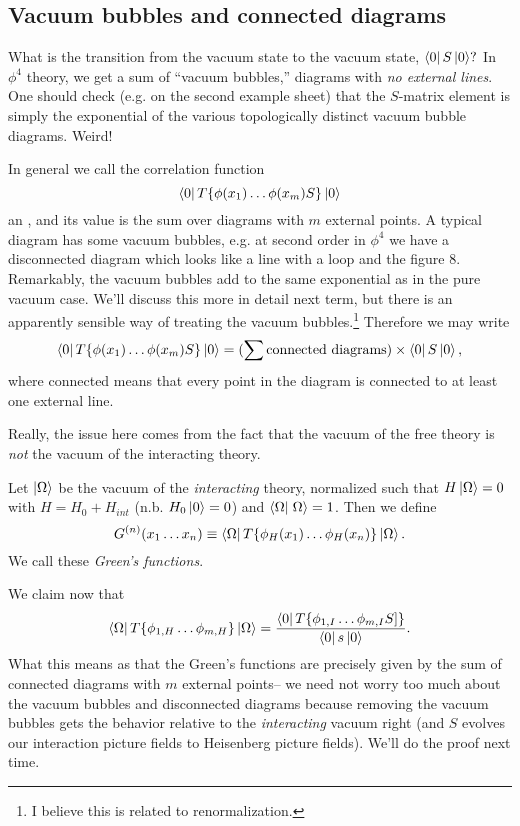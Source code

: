 \subsection*{Vacuum bubbles and connected diagrams} What is the transition from the vacuum state to the vacuum state, $\left< 0 \right|S\left| 0 \right>?$
In $\phi^4$ theory, we get a sum of ``vacuum bubbles,'' diagrams with \emph{no external lines}. One should check (e.g. on the second example sheet) that the $S$-matrix element is simply the exponential of the various topologically distinct vacuum bubble diagrams. Weird!%

In general we call the correlation function
$$\left< 0 \right|T\{\phi(x_1)\ldots \phi(x_m) S\}\left| 0 \right>$$
an , and its value is the sum over diagrams with $m$ external points. A typical diagram has some vacuum bubbles, e.g. at second order in $\phi^4$ we have a disconnected diagram which looks like a line with a loop and the figure 8. Remarkably, the vacuum bubbles add to the same exponential as in the pure vacuum case. We'll discuss this more in detail next term, but there is an apparently sensible way of treating the vacuum bubbles.\footnote{I believe this is related to renormalization.} Therefore we may write
$$\left< 0 \right|T\{\phi(x_1)\ldots \phi(x_m) S\}\left| 0 \right>=(\sum \text{connected diagrams})\times \left< 0 \right|S\left| 0 \right>,$$
where connected means that every point in the diagram is connected to at least one external line.

Really, the issue here comes from the fact that the vacuum of the free theory is \emph{not} the vacuum of the interacting theory. 
\begin{defn}
Let $\left| \Omega \right>$ be the vacuum of the \emph{interacting} theory, normalized such that
$H\left| \Omega \right>=0$ with $H=H_0+H_{int}$ (n.b. $H_0\left| 0 \right>=0$) and $\braket{\Omega}{\Omega}=1$. Then we define
$$G^{(n)}(x_1\ldots x_n)\equiv \left< \Omega \right|T\{\phi_H (x_1)\ldots \phi_H(x_n)\}\left| \Omega \right>.$$
We call these \emph{Green's functions}. 
\end{defn}
We claim now that
$$\left< \Omega \right|T\{\phi_{1,H}\ldots \phi_{m,H}\}\left| \Omega \right>=\frac{\left< 0 \right|T \{\phi_{1,I}\ldots \phi_{m,I}S]\}}{\left< 0 \right|s\left| 0 \right>}.$$
What this means as that the Green's functions are precisely given by the sum of connected diagrams with $m$ external points-- we need not worry too much about the vacuum bubbles and disconnected diagrams because removing the vacuum bubbles gets the behavior relative to the \emph{interacting} vacuum right (and $S$ evolves our interaction picture fields to Heisenberg picture fields). We'll do the proof next time.